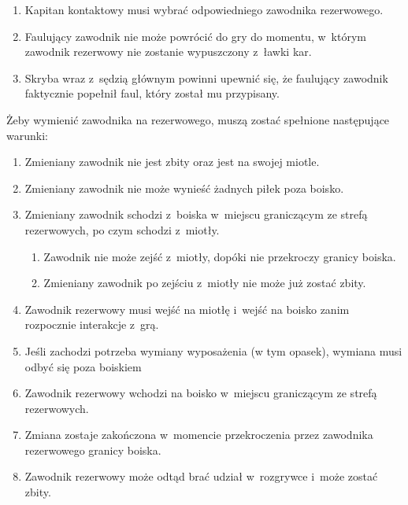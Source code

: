 \documentclass[12pt,a4paper]{article}
\renewcommand{\subsubsection}[1]{
  \oldsubsubsection{#1}%
  \leftskip1.5cm
}
\begin{document}
\begin{enumerate}
\begin{enumerate}
		            \begin{enumerate}
			            \item
			                  Kapitan kontaktowy musi wybrać odpowiedniego zawodnika
			                  rezerwowego.
			            \item
			                  Faulujący zawodnik nie może powrócić do gry do momentu, w~którym
			                  zawodnik rezerwowy nie zostanie wypuszczony z~ławki kar.
			            \item
			                  Skryba wraz z~sędzią głównym powinni upewnić się, że faulujący
			                  zawodnik faktycznie popełnił faul, który został mu przypisany.
		            \end{enumerate}
	      \end{enumerate}
\end{enumerate}

\subsubsection{Procedura zmiany}

Żeby wymienić zawodnika na rezerwowego, muszą zostać spełnione
następujące warunki:

\begin{enumerate}
	\item
	      Zmieniany zawodnik nie jest zbity oraz jest na swojej miotle.
	\item
	      Zmieniany zawodnik nie może wynieść żadnych piłek poza boisko.
	\item
	      Zmieniany zawodnik schodzi z~boiska w~miejscu graniczącym ze strefą
	      rezerwowych, po czym schodzi z~miotły.

	      \begin{enumerate}
		      \item
		            Zawodnik nie może zejść z~miotły, dopóki nie przekroczy granicy
		            boiska.
		      \item
		            Zmieniany zawodnik po zejściu z~miotły nie może już zostać zbity.
	      \end{enumerate}
	\item
	      Zawodnik rezerwowy musi wejść na miotłę i~wejść na boisko zanim
	      rozpocznie interakcje z~grą.
	\item
	      Jeśli zachodzi potrzeba wymiany wyposażenia (w tym opasek), wymiana
	      musi odbyć się poza boiskiem
	\item
	      Zawodnik rezerwowy wchodzi na boisko w~miejscu graniczącym ze strefą
	      rezerwowych.
	\item
	      Zmiana zostaje zakończona w~momencie przekroczenia przez zawodnika
	      rezerwowego granicy boiska.
	\item
	      Zawodnik rezerwowy może odtąd brać udział w~rozgrywce i~może zostać
	      zbity.
\end{enumerate}
\end{document}
